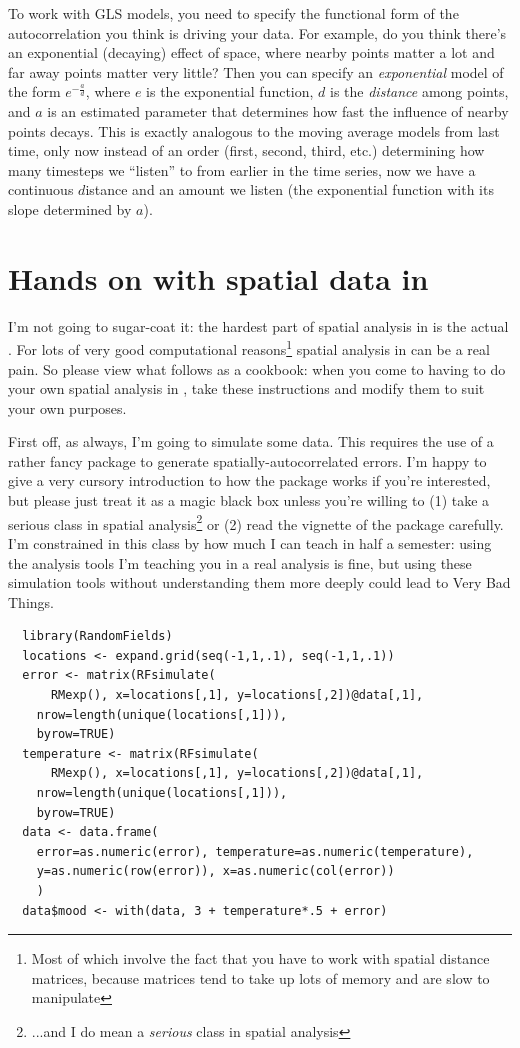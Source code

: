 To work with GLS models, you need to specify the functional form of
the autocorrelation you think is driving your data. For example, do
you think there's an exponential (decaying) effect of space, where
nearby points matter a lot and far away points matter very little?
Then you can specify an \emph{exponential} model of the form
$e^{-\frac{a}{d}}$, where $e$ is the exponential function, $d$ is the
\emph{distance} among points, and $a$ is an estimated parameter that
determines how fast the influence of nearby points decays. This is
exactly analogous to the moving average models from last time, only
now instead of an order (first, second, third, etc.) determining how
many timesteps we ``listen'' to from earlier in the time series, now
we have a continuous $d$istance and an amount we listen (the
exponential function with its slope determined by $a$).

\section{Hands on with spatial data in \R}
I'm not going to sugar-coat it: the hardest part of spatial analysis
in \R is the actual \R. For lots of very good computational
reasons\footnote{Most of which involve the fact that you have to work
  with spatial distance matrices, because matrices tend to take up
  lots of memory and are slow to manipulate} spatial analysis in \R
can be a real pain. So please view what follows as a cookbook: when
you come to having to do your own spatial analysis in \R, take these
instructions and modify them to suit your own purposes.

First off, as always, I'm going to simulate some data. This requires
the use of a rather fancy package to generate spatially-autocorrelated
errors. I'm happy to give a very cursory introduction to how the
package works if you're interested, but please just treat it as a
magic black box unless you're willing to (1) take a serious class in
spatial analysis\footnote{...and I do mean a \emph{serious} class in
  spatial analysis} or (2) read the vignette of the package
carefully. I'm constrained in this class by how much I can teach in
half a semester: using the analysis tools I'm teaching you in a real
analysis is fine, but using these simulation tools without
understanding them more deeply could lead to Very Bad Things.

\begin{verbatim}
  library(RandomFields)
  locations <- expand.grid(seq(-1,1,.1), seq(-1,1,.1))
  error <- matrix(RFsimulate(
      RMexp(), x=locations[,1], y=locations[,2])@data[,1],
    nrow=length(unique(locations[,1])),
    byrow=TRUE)
  temperature <- matrix(RFsimulate(
      RMexp(), x=locations[,1], y=locations[,2])@data[,1],
    nrow=length(unique(locations[,1])),
    byrow=TRUE)
  data <- data.frame(
    error=as.numeric(error), temperature=as.numeric(temperature),
    y=as.numeric(row(error)), x=as.numeric(col(error))
    )
  data$mood <- with(data, 3 + temperature*.5 + error)
\end{verbatim}%

